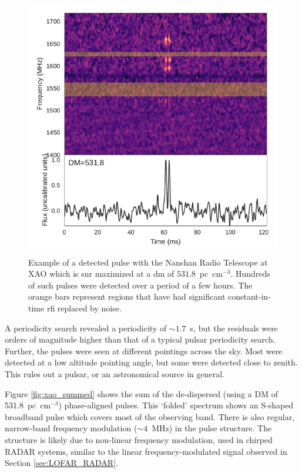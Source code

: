 \documentclass[a4paper,fleqn,usenatbib]{mnras}
\begin{document}
\begin{figure}
    \includegraphics[width=1.0\linewidth]{figures/XAO_pulse_dynamic.pdf}
    \caption{Example of a detected pulse with the Nanshan Radio Telescope at XAO
    which is \gls{snr} maximized at a \gls{dm} of $531.8$~pc~cm$^{-3}$.
    Hundreds of such pulses were detected over a period of a few hours. The
    orange bars represent regions that have had significant constant-in-time
    \gls{rfi} replaced by noise.
    }
    \label{fig:xao_dynamic}
\end{figure}

A periodicity search revealed a periodicity of $\sim 1.7$~s, but the residuals
were orders of magnitude higher than that of a typical pulsar periodicity
search.  Further, the pulses were seen at different pointings across the sky.
Most were detected at a low altitude pointing angle, but some were detected
close to zenith.  This rules out a pulsar, or an astronomical source in general.

Figure \ref{fig:xao_summed} shows the sum of the de-dispersed (using a DM of
531.8~pc~cm$^{-3}$) phase-aligned pulses.  This `folded' spectrum shows an
S-shaped broadband pulse which covers most of the observing band. There is also
regular, narrow-band frequency modulation ($\sim4$~MHz) in the pulse structure.
The structure is likely due to non-linear frequency modulation, used in
chirped RADAR systems, similar to the linear frequency-modulated signal observed
in Section \ref{sec:LOFAR_RADAR}.
\end{document}
